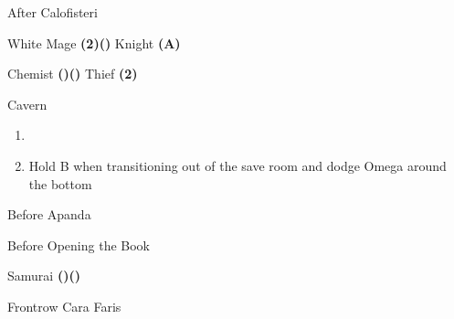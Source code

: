 \begin{paracol}{2}
\switchcolumnTwice[*]
\begin{menu}{After Calofisteri}
    \varwb
    \begin{jobMenu}
        \cara White Mage \textbf{(2\pointRight)(\pointDown)}
        \lenna Knight \textbf{(A)} \ability{!\dimenAbility} \optimize
    \end{jobMenu}
    \begin{magicMenu}
        \lenna \float \space \then {}
        \cara \size \space \then {}
        \cara \life \space \then {}
    \end{magicMenu}
    \begin{equipMenu}
        \faris {}
        \bartz \optimize
    \end{equipMenu}
    \begin{jobMenu}
        \faris Chemist \textbf{(\pointUp)(\pointRight)} \ability{!\gilToss}
        \cara Thief \textbf{(2\pointRight)}
    \end{jobMenu}
    \varwe
\end{menu}

\switchcolumn
\begin{steproute}{Cavern}
\end{steproute}

\switchcolumn
\begin{enumerate}[resume]
    \item {}
    \item Hold B when transitioning out of the save room and dodge Omega around the bottom
\end{enumerate}

\switchcolumn
\begin{steproute}{Before Apanda}
\end{steproute}

\switchcolumn
\begin{menu}{Before Opening the Book}
    \varwb
    \begin{jobMenu}
        \cara Samurai \textbf{(\pointLeft)(\pointDown)}
    \end{jobMenu}
    \begin{rowMenu}
        \caraFarisBartz Frontrow
        \swap Cara \switch Faris
    \end{rowMenu}
    \varwe
\end{menu}


\end{paracol}
